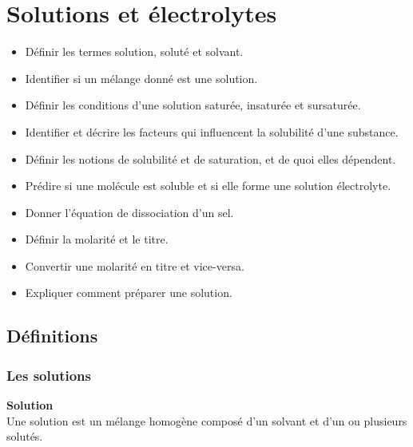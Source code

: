 \documentclass[
  11pt,
  french,
  a4paper,
  openany]{book}
\providecommand{\tightlist}{%
  \setlength{\itemsep}{0pt}\setlength{\parskip}{0pt}}
\begin{document}
\hypertarget{solutions-et-uxe9lectrolytes}{%
\chapter{Solutions et électrolytes}\label{solutions-et-uxe9lectrolytes}}

\begin{objectives}

\begin{itemize}
\tightlist
\item
  Définir les termes solution, soluté et solvant.
\item
  Identifier si un mélange donné est une solution.
\item
  Définir les conditions d'une solution saturée, insaturée et sursaturée.
\item
  Identifier et décrire les facteurs qui influencent la solubilité d'une substance.
\item
  Définir les notions de solubilité et de saturation, et de quoi elles dépendent.
\item
  Prédire si une molécule est soluble et si elle forme une solution électrolyte.
\item
  Donner l'équation de dissociation d'un sel.
\item
  Définir la molarité et le titre.
\item
  Convertir une molarité en titre et vice-versa.
\item
  Expliquer comment préparer une solution.
\end{itemize}


\end{objectives}

\hypertarget{duxe9finitions}{%
\section{Définitions}\label{duxe9finitions}}

\hypertarget{les-solutions}{%
\subsection{Les solutions}\label{les-solutions}}

\begin{tcolorbox}
\textbf{Solution}\\
Une solution est un mélange homogène composé d'un solvant et d'un ou plusieurs solutés.

\end{tcolorbox}
\end{document}
